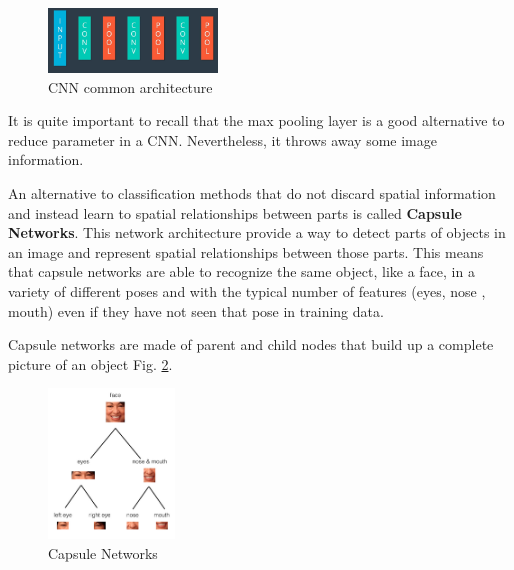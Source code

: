 \documentclass{article}
\begin{document}
\begin{figure}[ht]
    \centering
    \includegraphics[width=0.4\textwidth,height=0.4\textheight,keepaspectratio]{images/architecture.png}
    \captionsetup{justification=centering}
    \caption{CNN common architecture}
    \label{fig:f22}
\end{figure}

It is quite important to recall that the max pooling layer is a good alternative to reduce parameter in a CNN. Nevertheless, it throws away some image information.


An alternative to classification methods that do not discard spatial information and instead learn to spatial relationships between parts is called \textbf{Capsule Networks}. This network architecture provide a way to detect parts of objects in an image and represent spatial relationships between those parts. This means that capsule networks are able to recognize the same object, like a face, in a variety of different poses and with the typical number of features (eyes, nose , mouth) even if they have not seen that pose in training data. 

Capsule networks are made of parent and child nodes that build up a complete picture of an object Fig. \ref{fig:f23}.

\begin{figure}[ht]
    \centering
    \includegraphics[width=0.3\textwidth,height=0.3\textheight,keepaspectratio]{images/faces.png}
    \captionsetup{justification=centering}
    \caption{Capsule Networks}
    \label{fig:f23}
\end{figure}


\printbibliography
\end{document}
